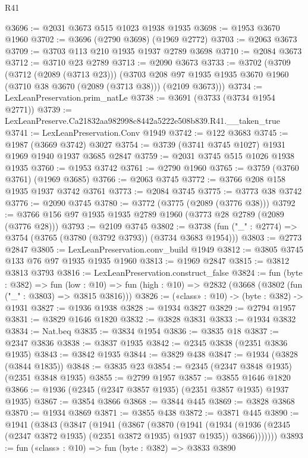 \begin{lexlean}{R41}
\begin{coremodule}
@3696 := @2031 @3673 @515 @1023 @1938 @1935
@3698 := @1953 @3670 @1960
@3702 := @3696 (@2790 @3698) (@1969 @2772)
@3703 := @2063 @3673
@3709 := @3703 @113 @210 @1935 @1937 @2789 @3698
@3710 := @2084 @3673
@3712 := @3710 @23 @2789
@3713 := @2090 @3673
@3733 := @3702
    (@3709
      (@3712 (@2089 (@3713 @23)))
      (@3703 @208 @97 @1935 @1935 @3670 @1960 (@3710 @38 @3670 (@2089 (@3713 @38))) (@2109 @3673)))
@3734 := LexLeanPreservation.prim_natLe
@3738 := @3691 (@3733 (@3734 @1954 @2771))
@3739 := LexLeanPreserve.Ca21832aa982998c8442a5222e508b839.R41.__taken_true
@3741 := LexLeanPreservation.Conv @1949
@3742 := @122 @3683
@3745 := @1987 (@3669 @3742) @3027
@3754 := @3739 (@3741 @3745 @1027) @1931 @1969 @1940 @1937 @3685 @2847
@3759 := @2031 @3745 @515 @1026 @1938 @1935
@3760 := @1953 @3742
@3761 := @2790 @1960
@3765 := @3759 (@3760 @3761) (@1969 @3685)
@3766 := @2063 @3745
@3772 := @3766 @208 @158 @1935 @1937 @3742 @3761
@3773 := @2084 @3745
@3775 := @3773 @38 @3742
@3776 := @2090 @3745
@3780 := @3772 (@3775 (@2089 (@3776 @38)))
@3792 := @3766 @156 @97 @1935 @1935 @2789 @1960 (@3773 @28 @2789 (@2089 (@3776 @28)))
@3793 := @2109 @3745
@3802 := @3738 (fun ("_" : @2774) => @3754 (@3765 (@3780 (@3792 @3793)) (@3734 @3683 @1954)))
@3803 := @2773 @2847
@3805 := LexLeanPreservation.conv_build @1949
@3812 := @3805 @3745 @133 @76 @97 @1935 @1935 @1960
@3813 := @1969 @2847
@3815 := @3812 @3813 @3793
@3816 := LexLeanPreservation.construct_false
@3824 := fun (byte : @382) =>
  fun (low : @10) => fun (high : @10) => @2832 (@3668 (@3802 (fun ("_" : @3803) => @3815 @3816)))
@3826 := («class» : @10) -> (byte : @382) -> @1931
@3827 := @1936 @1938
@3828 := @1934 @3827
@3829 := @2794 @1957
@3831 := @3829 @1646 @1820
@3832 := @3828 @3831
@3833 := @1934 @3832
@3834 := Nat.beq
@3835 := @3834 @1954
@3836 := @3835 @18
@3837 := @2347 @3836
@3838 := @3837 @1935
@3842 := @2345 @3838 (@2351 @3836 @1935)
@3843 := @3842 @1935
@3844 := @3829 @438
@3847 := @1934 (@3828 (@3844 @1835))
@3848 := @3835 @23
@3854 := @2345 (@2347 @3848 @1935) (@2351 @3848 @1935)
@3855 := @2799 @1957
@3857 := @3855 @1646 @1820
@3866 := @1936 (@2345 (@2347 @3857 @1935) (@2351 @3857 @1935) @1937 @1935)
@3867 := @3854 @3866
@3868 := @3844 @445
@3869 := @3828 @3868
@3870 := @1934 @3869
@3871 := @3855 @438
@3872 := @3871 @445
@3890 := @1941
    (@3843
      (@3847
        (@1941
          (@3867
            (@3870
              (@1941
                (@1934
                  (@1936 (@2345 (@2347 @3872 @1935) (@2351 @3872 @1935) @1937 @1935))
                  @3866)))))))
@3893 := fun («class» : @10) => fun (byte : @382) => @3833 @3890

\end{coremodule}
\end{lexlean}
